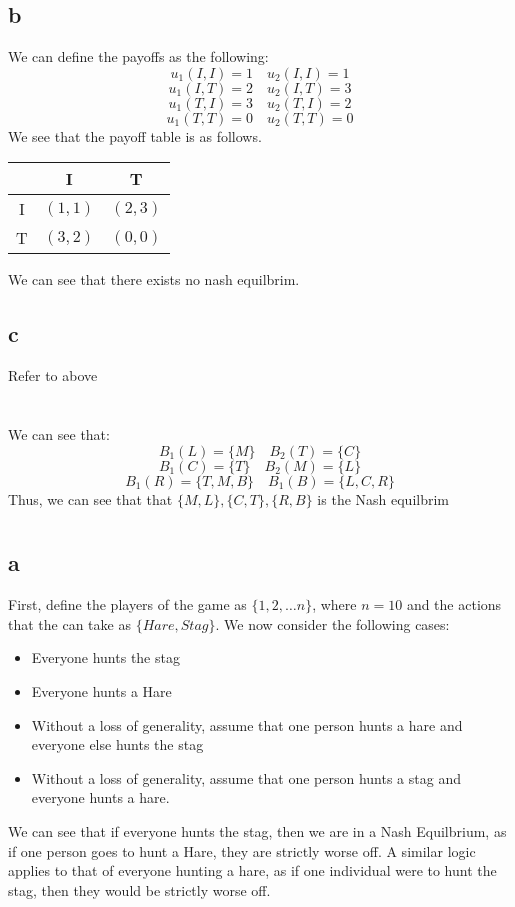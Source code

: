 \documentclass[11pt]{article}
\begin{document}
\subsection*{b}
We can define the payoffs as the following:
\[
u_1(I,I) = 1 \quad u_2(I, I) = 1
\]
\[
u_1(I, T) = 2 \quad u_2(I,T) = 3
\]
\[
u_1(T, I) = 3 \quad u_2(T, I) = 2
\]
\[
u_1(T,T) = 0 \quad u_2(T, T) = 0
\]
We see that the payoff table is as follows.
\begin{table}[H]
    \centering 
    \begin{tabular}{c|c|c}
        & I & T\\
        \hline
        I & $(1,1)$ & $(2,3)$\\
        T & $(3,2)$ & $(0,0)$ 
    \end{tabular}
\end{table}
\noindent We can see that there exists no nash equilbrim. 
\subsection*{c}
Refer to above
\section{}
We can see that:
\[
B_1(L) = \{M\} \quad B_2(T) = \{C\}
\]
\[
B_1(C) = \{ T \} \quad B_2(M) = \{L\}
\]
\[
B_1(R) = \{T, M , B\} \quad B_1(B) = \{L, C,R\}
\]
Thus, we can see that that $\{M, L\}, \{C,T\},\{R, B\} $ is the Nash equilbrim 
\section{}
\subsection*{a}
First, define the players of the game as $\{1, 2, \dots n\}$, where $n = 10$ and the actions that the can take as $\{Hare, Stag\}$. We now consider the following cases:
\begin{itemize}
    \item Everyone hunts the stag 
    \item Everyone hunts a Hare
    \item Without a loss of generality, assume that one person hunts a hare and everyone else hunts the stag
    \item Without a loss of generality, assume that one person hunts a stag and everyone hunts a hare. 
\end{itemize}
We can see that if everyone hunts the stag, then we are in a Nash Equilbrium, as if one person goes to hunt a Hare, they are strictly worse off. A similar logic applies to that of everyone hunting a hare, as if one individual were to hunt the stag, then they would be strictly worse off. 
\end{document}
